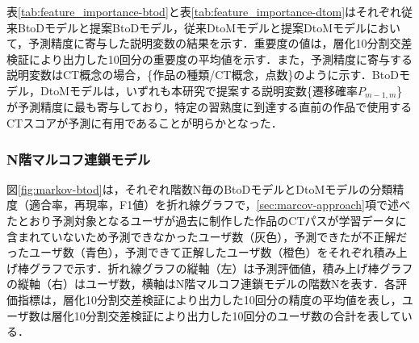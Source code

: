 \documentclass[submit]{ipsj}
\begin{document}
表\ref{tab:feature_importance-btod}と表\ref{tab:feature_importance-dtom}はそれぞれ従来BtoDモデルと提案BtoDモデル，従来DtoMモデルと提案DtoMモデルにおいて，予測精度に寄与した説明変数の結果を示す．重要度の値は，層化10分割交差検証により出力した10回分の重要度の平均値を示す．また，予測精度に寄与する説明変数はCT概念の場合，\{作品の種類/CT概念，点数\}のように示す．BtoDモデル，DtoMモデルは，いずれも本研究で提案する説明変数\{遷移確率$P_{m-1,m}$\}が予測精度に最も寄与しており，特定の習熟度に到達する直前の作品で使用するCTスコアが予測に有用であることが明らかとなった．








\subsubsection{N階マルコフ連鎖モデル}\label{sec:markovResult}

図\ref{fig:markov-btod}は，それぞれ階数N毎のBtoDモデルとDtoMモデルの分類精度（適合率，再現率，F1値）を折れ線グラフで，\ref{sec:marcov-approach}項で述べたとおり予測対象となるユーザが過去に制作した作品のCTパスが学習データに含まれていないため予測できなかったユーザ数（灰色），予測できたが不正解だったユーザ数（青色），予測できて正解したユーザ数（橙色）をそれぞれ積み上げ棒グラフで示す．折れ線グラフの縦軸（左）は予測評価値，積み上げ棒グラフの縦軸（右）はユーザ数，横軸はN階マルコフ連鎖モデルの階数Nを表す．各評価指標は，層化10分割交差検証により出力した10回分の精度の平均値を表し，ユーザ数は層化10分割交差検証により出力した10回分のユーザ数の合計を表している．
\end{document}
